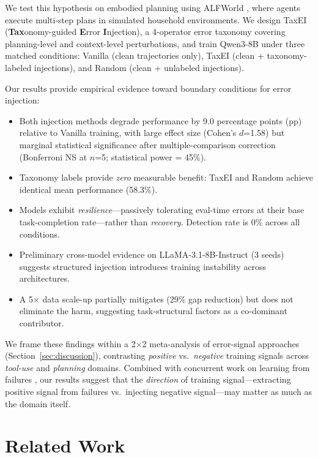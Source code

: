 \documentclass[11pt]{article}
\begin{document}
We test this hypothesis on embodied planning using ALFWorld \cite{shridhar2021alfworld}, where agents execute multi-step plans in simulated household environments.
We design TaxEI (\textbf{Tax}onomy-guided \textbf{E}rror \textbf{I}njection), a 4-operator error taxonomy covering planning-level and context-level perturbations, and train Qwen3-8B \cite{qwen3} under three matched conditions: Vanilla (clean trajectories only), TaxEI (clean + taxonomy-labeled injections), and Random (clean + unlabeled injections).

Our results provide empirical evidence toward boundary conditions for error injection:
\begin{itemize}
\item Both injection methods degrade performance by 9.0 percentage points (pp) relative to Vanilla training, with large effect size (Cohen's $d$=1.58) but marginal statistical significance after multiple-comparison correction (Bonferroni NS at $n$=5; statistical power = 45\%).
\item Taxonomy labels provide \emph{zero} measurable benefit: TaxEI and Random achieve identical mean performance (58.3\%).
\item Models exhibit \emph{resilience}---passively tolerating eval-time errors at their base task-completion rate---rather than \emph{recovery}. Detection rate is 0\% across all conditions.
\item Preliminary cross-model evidence on LLaMA-3.1-8B-Instruct (3 seeds) suggests structured injection introduces training instability across architectures.
\item A 5$\times$ data scale-up partially mitigates (29\% gap reduction) but does not eliminate the harm, suggesting task-structural factors as a co-dominant contributor.
\end{itemize}

We frame these findings within a 2$\times$2 meta-analysis of error-signal approaches (Section~\ref{sec:discussion}), contrasting \emph{positive} vs.\ \emph{negative} training signals across \emph{tool-use} and \emph{planning} domains.
Combined with concurrent work on learning from failures \cite{wang2025eef}, our results suggest that the \emph{direction} of training signal---extracting positive signal from failures vs.\ injecting negative signal---may matter as much as the domain itself.

\section{Related Work}
\end{document}
